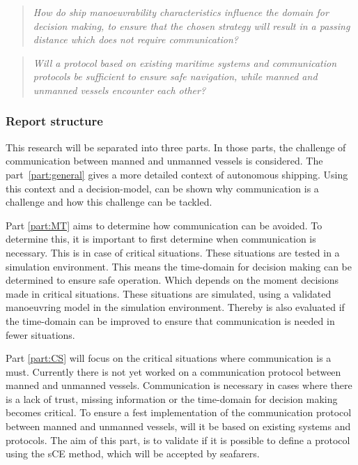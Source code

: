 \begin{quotation}
	\emph{How do ship manoeuvrability characteristics influence the domain for decision making, to ensure that the chosen strategy will result in a passing distance which does not require communication?} 
\end{quotation}

\begin{quotation}
	\emph{Will a protocol based on existing maritime systems and communication protocols be sufficient to ensure safe navigation, while manned and unmanned vessels encounter each other?}
\end{quotation}

\subsubsection*{Report structure}
This research will be separated into three parts. In those parts, the challenge of communication between manned and unmanned vessels is considered. The part~\ref{part:general} gives a more detailed context of autonomous shipping. Using this context and a decision-model, can be shown why communication is a challenge and how this challenge can be tackled.

Part \ref{part:MT} aims to determine how communication can be avoided. To determine this, it is important to first determine when communication is necessary. This is in case of critical situations. These situations are tested in a simulation environment. This means the time-domain for decision making can be determined to ensure safe operation. Which depends on the moment decisions made in critical situations. These situations are simulated, using a validated manoeuvring model in the simulation environment. Thereby is also evaluated if the time-domain can be improved to ensure that communication is needed in fewer situations.

Part \ref{part:CS} will focus on the critical situations where communication is a must. Currently there is not yet worked on a communication protocol between manned and unmanned vessels. Communication is necessary in cases where there is a lack of trust, missing information or the time-domain for decision making becomes critical. To ensure a fest implementation of the communication protocol between manned and unmanned vessels, will it be based on existing systems and protocols. The aim of this part, is to validate if it is possible to define a protocol using the \acf{sCE} method, which will be accepted by seafarers.
